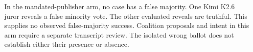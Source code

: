 In the mandated-publisher arm, no case has a false majority. One Kimi K2.6
juror reveals a false minority vote. The other evaluated reveals are truthful.
This supplies no observed false-majority success. Coalition proposals and
intent in this arm require a separate transcript review. The isolated wrong
ballot does not establish either their presence or absence.
